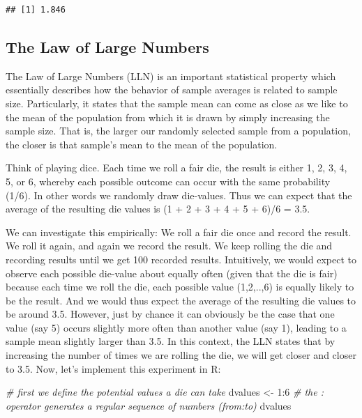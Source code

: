 \documentclass[
  12pt,
]{style/krantz}
\newenvironment{Shaded}{\begin{snugshade}}{\end{snugshade}}
\newcommand{\CommentTok}[1]{\textcolor[rgb]{0.56,0.35,0.01}{\textit{#1}}}
\newcommand{\DecValTok}[1]{\textcolor[rgb]{0.00,0.00,0.81}{#1}}
\newcommand{\NormalTok}[1]{#1}
\newcommand{\OtherTok}[1]{\textcolor[rgb]{0.56,0.35,0.01}{#1}}
\newcommand{\SpecialCharTok}[1]{\textcolor[rgb]{0.00,0.00,0.00}{#1}}
\begin{document}
\begin{verbatim}
## [1] 1.846
\end{verbatim}

\hypertarget{the-law-of-large-numbers}{%
\subsection{The Law of Large Numbers}\label{the-law-of-large-numbers}}

The Law of Large Numbers (LLN) is an important statistical property which essentially describes how the behavior of sample averages is related to sample size. Particularly, it states that the sample mean can come as close as we like to the mean of the population from which it is drawn by simply increasing the sample size. That is, the larger our randomly selected sample from a population, the closer is that sample's mean to the mean of the population.

Think of playing dice. Each time we roll a fair die, the result is either 1, 2, 3, 4, 5, or 6, whereby each possible outcome can occur with the same probability (1/6). In other words we randomly draw die-values. Thus we can expect that the average of the resulting die values is (1 + 2 + 3 + 4 + 5 + 6)/6 = 3.5.

We can investigate this empirically: We roll a fair die once and record the result. We roll it again, and again we record the result. We keep rolling the die and recording results until we get 100 recorded results. Intuitively, we would expect to observe each possible die-value about equally often (given that the die is fair) because each time we roll the die, each possible value (1,2,..,6) is equally likely to be the result. And we would thus expect the average of the resulting die values to be around 3.5. However, just by chance it can obviously be the case that one value (say 5) occurs slightly more often than another value (say 1), leading to a sample mean slightly larger than 3.5. In this context, the LLN states that by increasing the number of times we are rolling the die, we will get closer and closer to 3.5. Now, let's implement this experiment in R:

\begin{Shaded}
\begin{Highlighting}[]
\CommentTok{\# first we define the potential values a die can take}
\NormalTok{dvalues }\OtherTok{\textless{}{-}} \DecValTok{1}\SpecialCharTok{:}\DecValTok{6} \CommentTok{\# the : operator generates a regular sequence of numbers (from:to)}
\NormalTok{dvalues}
\end{Highlighting}
\end{Shaded}
\end{document}
